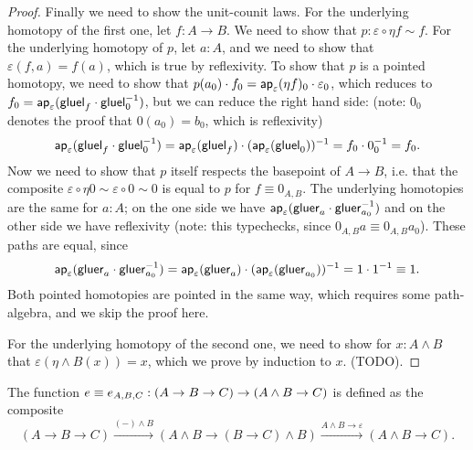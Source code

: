 \documentclass{article}
\newcommand{\pmap}{\to}
\newcommand{\lpmap}{\xrightarrow}
\renewcommand{\smash}{\wedge}
\renewcommand{\epsilon}{\varepsilon}
\newcommand{\tr}{\cdot}
\renewcommand{\o}{\ensuremath{\circ}}
\newcommand{\gluel}{\mathsf{gluel}}
\newcommand{\gluer}{\mathsf{gluer}}
\newcommand{\sy}{^{-1}}
\begin{document}
\begin{proof}
  Finally we need to show the unit-counit laws. For the underlying homotopy of the first one, let
  $f:A\to B$. We need to show that $p:\epsilon\o\eta f\sim f$. For the underlying homotopy of $p$,
  let $a:A$, and we need to show that $\epsilon(f,a)=f(a)$, which is true by reflexivity. To show
  that $p$ is a pointed homotopy, we need to show that
  $p(a_0)\tr f_0=\mapfunc{\epsilon}(\eta f)_0\tr \epsilon_0$, which reduces to
  $f_0=\mapfunc{\epsilon}(\gluel_f\tr\gluel_0\sy)$, but we can reduce the right hand side: (note:
  $0_0$ denotes the proof that $0(a_0)=b_0$, which is reflexivity)
  $$\mapfunc{\epsilon}(\gluel_f\tr\gluel_0\sy)=\mapfunc{\epsilon}(\gluel_f)\tr(\mapfunc{\epsilon}(\gluel_0))\sy=f_0\tr 0_0\sy=f_0.$$
  Now we need to show that $p$ itself respects the basepoint of $A\to B$, i.e. that the composite
  $\epsilon\o\eta0\sim\epsilon\o0\sim0$ is equal to $p$ for $f\equiv 0_{A,B}$. The underlying
  homotopies are the same for $a : A$; on the one side we have
  $\mapfunc{\epsilon}(\gluer_{a}\tr\gluer_{a_0}\sy)$ and on the other side we have reflexivity
  (note: this typechecks, since $0_{A,B}a\equiv0_{A,B}a_0$). These paths are equal, since
  $$\mapfunc{\epsilon}(\gluer_{a}\tr\gluer_{a_0}\sy)=\mapfunc{\epsilon}(\gluer_{a})\tr(\mapfunc\epsilon(\gluer_{a_0}))\sy=1\cdot1\sy\equiv1.$$
  Both pointed homotopies are pointed in the same way, which requires some path-algebra, and we skip
  the proof here.

  For the underlying homotopy of the second one, we need to show for $x:A\smash B$ that
  $\epsilon(\eta\smash B(x))=x$, which we prove by induction to $x$. (TODO).

\end{proof}

\begin{defn}
The function $e\jdeq e_{A,B,C}:(A\pmap B\pmap C)\pmap(A\smash B\pmap C)$ is defined as the composite
$$(A\pmap B\pmap C)\lpmap{({-})\smash B}(A\smash B\pmap (B\pmap C)\smash B)\lpmap{A\smash B \pmap\epsilon}(A\smash B\pmap C).$$
\end{defn}
\end{document}
